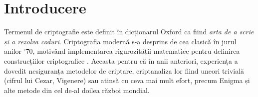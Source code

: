 \documentclass[oneside, 12pt]{book}
\begin{document}
\setcounter{tocdepth}{2}
\tableofcontents








\chapter*{Introducere}

Termenul de criptografie este definit în dicționarul Oxford ca fiind \textit{arta de a scrie și a rezolva coduri}.
Criptografia modernă s-a desprins de cea clasică în jurul anilor '70, motivând implementarea rigurozității matematice pentru definirea construcțiilor criptografice \cite{diffie1976new}. Aceasta pentru că în anii anteriori, experiența a dovedit nesiguranța metodelor de criptare, criptanaliza lor fiind uneori trivială (cifrul lui Cezar, Vigenere) sau atinsă cu ceva mai mult efort, precum Enigma și alte metode din cel de-al doilea război mondial.
\end{document}
